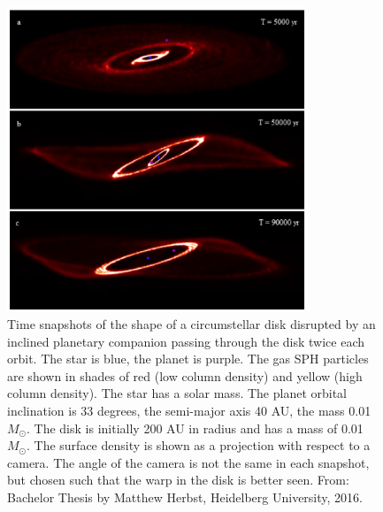 \documentclass[10pt,fleqn,twoside]{article}
\begin{document}
\begin{figure}
\centerline{\includegraphics[width=0.8\textwidth]{D2Fig/Herbst_Fig6.eps}}
\caption{\label{fig-herbst-6}Time snapshots of the shape of a circumstellar
  disk disrupted by an inclined planetary companion passing through the disk
  twice each orbit. The star is blue, the planet is purple. The gas SPH
  particles are shown in shades of red (low column density) and yellow (high
  column density). The star has a solar mass. The planet orbital inclination
  is 33 degrees, the semi-major axis 40 AU, the mass 0.01 $M_{\odot}$. The
  disk is initially 200 AU in radius and has a mass of 0.01 $M_{\odot}$. The
  surface density is shown as a projection with respect to a camera. The
  angle of the camera is not the same in each snapshot, but chosen such that
  the warp in the disk is better seen. From: Bachelor Thesis by Matthew
  Herbst, Heidelberg University, 2016.}
\end{figure}
\end{document}
